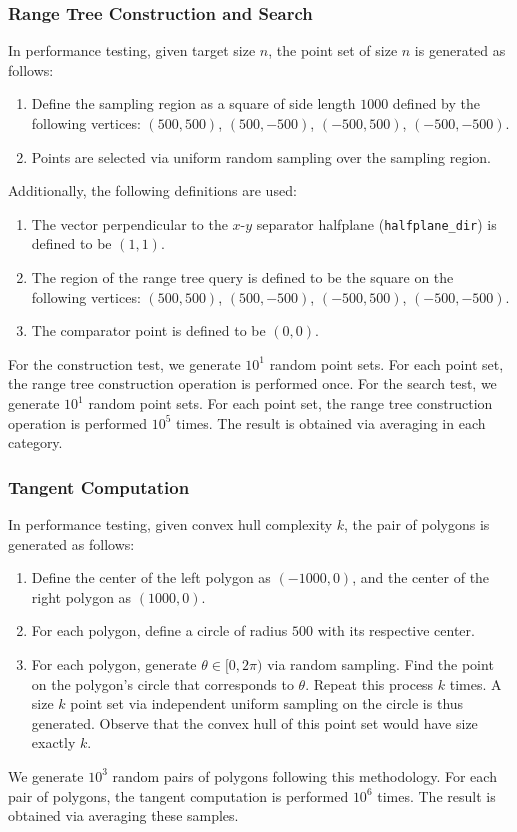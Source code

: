\documentclass{article}
\begin{document}
\begin{appendices}
    \subsubsection{Range Tree Construction and Search}

    In performance testing, given target size $n$, the point set of size $n$ is generated as follows:
    \begin{enumerate}
        \item Define the sampling region as a square of side length $1000$ defined by the following vertices: $(500, 500)$, $(500, -500)$, $(-500, 500)$, $(-500, -500)$.
        \item Points are selected via uniform random sampling over the sampling region. 
    \end{enumerate}
    Additionally, the following definitions are used:
    \begin{enumerate}
        \item The vector perpendicular to the $x$-$y$ separator halfplane (\texttt{halfplane\_dir}) is defined to be $(1, 1)$.
        \item The region of the range tree query is defined to be the square on the following vertices: $(500, 500)$, $(500, -500)$, $(-500, 500)$, $(-500, -500)$.
        \item The comparator point is defined to be $(0, 0)$.
    \end{enumerate}
    For the construction test, we generate $10^1$ random point sets. For each point set, the range tree construction operation is performed once. For the search test, we generate $10^1$ random point sets. For each point set, the range tree construction operation is performed $10^5$ times. The result is obtained via averaging in each category.

    \subsubsection{Tangent Computation}

    In performance testing, given convex hull complexity $k$, the pair of polygons is generated as follows:
    \begin{enumerate}
        \item Define the center of the left polygon as $(-1000, 0)$, and the center of the right polygon as $(1000, 0)$.
        \item For each polygon, define a circle of radius $500$ with its respective center.
        \item For each polygon, generate $\theta \in [0, 2\pi)$ via random sampling. Find the point on the polygon's circle that corresponds to $\theta$. Repeat this process $k$ times. A size $k$ point set via independent uniform sampling on the circle is thus generated. Observe that the convex hull of this point set would have size exactly $k$. 
    \end{enumerate}
    We generate $10^3$ random pairs of polygons following this methodology. For each pair of polygons, the tangent computation is performed $10^6$ times. The result is obtained via averaging these samples. 


\end{appendices}
\end{document}
